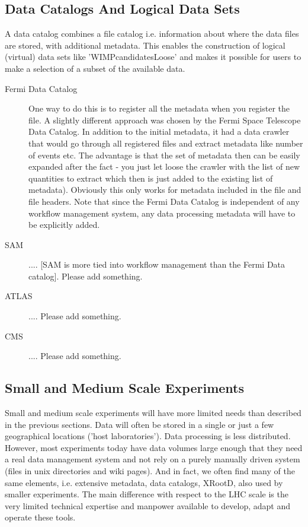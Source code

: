 \subsection{Data Catalogs And Logical Data Sets}
A data catalog combines a file catalog i.e. information about where the data files are stored, with additional metadata.
This enables the construction of logical (virtual) data sets like 'WIMPcandidatesLoose' and makes it possible for users to 
make a selection of a subset of the available data. 

\begin{description}
\item[Fermi Data Catalog] One way to do this is to register all the metadata when you register the file. A slightly
different approach was chosen by the Fermi Space Telescope Data Catalog. In addition to the initial metadata, it had a
data crawler that would go through all registered files and extract metadata like number of events etc. The advantage is
that the set of metadata then can be easily expanded after the fact - you just let loose the crawler with the list
of new quantities to extract which then is just added to the existing list of metadata). Obviously this only works for 
metadata included in the file and file headers.  Note that since the Fermi 
Data Catalog is independent of any workflow management system, any data processing metadata will have to be explicitly added. 



\item[SAM] .... [SAM is more tied into workflow management than the Fermi Data catalog]. Please add something.

\item[ATLAS] .... Please add something.

\item[CMS] .... Please add something.

\end{description}

\subsection{Small and Medium Scale Experiments}
Small and medium scale experiments will have more limited needs than described in the previous sections. Data will often be stored in a single or 
just a few geographical locations ('host laboratories'). Data processing is less distributed. However, most experiments today have data volumes large 
enough that they need a real data management system and not rely on a purely manually driven system (files in unix directories and wiki pages). 
And in fact, we often find many of the same elements, i.e. extensive metadata, data catalogs, XRootD, also used by smaller 
experiments. The main difference with respect to the LHC scale is the very limited technical expertise and manpower available to develop, adapt and 
operate these tools.





